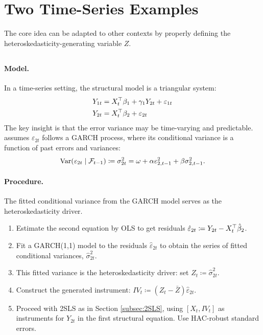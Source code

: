 \section{Two Time-Series Examples}

The core idea can be adapted to other contexts by properly defining
the heteroskedasticity-generating variable $Z$.

\subsection[Prono (2014)]{\textcite{prono2014}}

\paragraph{Model.}

In a time-series setting, the structural model is a triangular system:
\begin{align*}
Y_{1t} & =X_{t}^{\top}\beta_{1}+\gamma_{1}Y_{2t}+\varepsilon_{1t}\\
Y_{2t} & =X_{t}^{\top}\beta_{2}+\varepsilon_{2t}
\end{align*}
The key insight is that the error variance may be time-varying and
predictable. \textcite{prono2014} assumes $\varepsilon_{2t}$ follows
a GARCH process, where its conditional variance is a function of past
errors and variances:
\[
\operatorname{Var}(\varepsilon_{2t}\mid\mathcal{F}_{t-1})\coloneqq\sigma_{2t}^{2}=\omega+\alpha\varepsilon_{2,t-1}^{2}+\beta\sigma_{2,t-1}^{2}.
\]


\paragraph{Procedure.}

The fitted conditional variance from the GARCH model serves as the
heteroskedasticity driver.
\begin{enumerate}
\itemsep2pt
\item Estimate the second equation by OLS to get residuals $\hat{\varepsilon}_{2t}\coloneqq Y_{2t}-X_{t}^{\top}\hat{\beta}_{2}$.
\item Fit a GARCH(1,1) model to the residuals $\hat{\varepsilon}_{2t}$
to obtain the series of fitted conditional variances, $\hat{\sigma}_{2t}^{2}$.
\item This fitted variance is the heteroskedasticity driver: set $Z_{t}\coloneqq\hat{\sigma}_{2t}^{2}$.
\item Construct the generated instrument: $IV_{t}\coloneqq(Z_{t}-\bar{Z})\hat{\varepsilon}_{2t}$.
\item Proceed with 2SLS as in Section \ref{subsec:2SLS}, using $[X_{t},IV_{t}]$
as instruments for $Y_{2t}$ in the first structural equation. Use
HAC-robust standard errors.
\end{enumerate}

